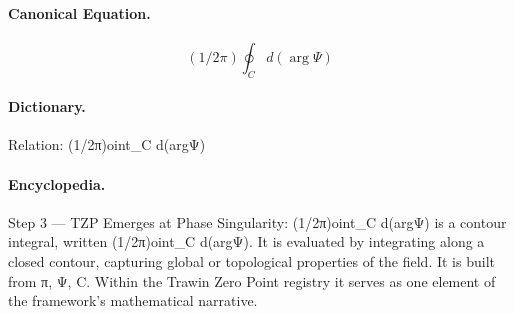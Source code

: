\paragraph{Canonical Equation.}
\[
(1/2\pi)\oint_C d(\arg\Psi)
\]

\paragraph{Dictionary.}
Relation: (1/2π)oint\_C d(argΨ)

\paragraph{Encyclopedia.}
Step 3 — TZP Emerges at Phase Singularity: (1/2π)oint\_C d(argΨ) is a contour integral, written (1/2π)oint\_C d(argΨ). It is evaluated by integrating along a closed contour, capturing global or topological properties of the field. It is built from π, Ψ, C. Within the Trawin Zero Point registry it serves as one element of the framework's mathematical narrative.
